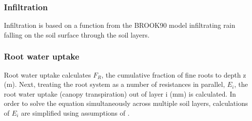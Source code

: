 \documentclass[preprint,12pt,authoryear]{elsarticle}
\begin{document}
\subsubsection{Infiltration}

Infiltration is based on a function from the BROOK90 model \citep{Federer2003} infiltrating rain falling on the soil surface through the soil layers.

%



\subsubsection{Root water uptake}
Root water uptake calculates $F_{R}$, the cumulative fraction of fine roots to depth z (m). Next, treating the root system as a number of resistances in parallel, $E_{i}$, the root water uptake (canopy transpiration) out of layer i (mm) is calculated. In order to solve the equation simultaneously across multiple soil layers, calculations of $E_{i}$ are simplified using assumptions of \cite{Taylor1975}.
\end{document}
